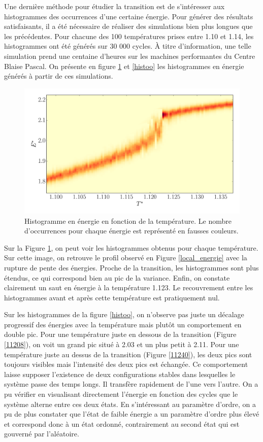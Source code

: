 \documentclass[11pt,a4paper]{article}
\numberwithin{equation}{section}
\begin{document}
Une dernière méthode pour étudier la transition est de s'intéresser aux histogrammes des occurrences d'une certaine énergie. Pour générer des résultats satisfaisants, il a été nécessaire de réaliser des simulations bien plus longues que les précédentes. Pour chacune des 100 températures prises entre 1.10 et 1.14, les histogrammes ont été générés sur 30 000 cycles. À titre d'information, une telle simulation prend une centaine d'heures sur les machines performantes du Centre Blaise Pascal. On présente en figure \ref{imagehisto} et \ref{histoo} les histogrammes en énergie générés à partir de ces simulations.

\begin{figure}[h!]
    \centering	    
	\includegraphics[scale=0.5]{figures/histo_image.pdf}
    \caption{Histogramme en énergie en fonction de la température. Le nombre d’occurrences pour chaque énergie est représenté en fausses couleurs.}
    	\label{imagehisto} 
\end{figure}
Sur la Figure \ref{imagehisto}, on peut voir les histogrammes obtenus pour chaque température. Sur cette image, on retrouve le profil observé en Figure \ref{local_energie} avec la rupture de pente des énergies. Proche de la transition, les histogrammes sont plus étendus, ce qui correspond bien au pic de la variance. Enfin, on constate clairement un saut en énergie à la température 1.123. Le recouvrement entre les histogrammes avant et après cette température est pratiquement nul.
\medskip

Sur les histogrammes de la figure \ref{histoo}, on n'observe pas juste un décalage progressif des énergies avec la température mais plutôt un comportement en double pic. Pour une température juste en dessous de la transition (Figure \ref{11208}), on voit un grand pic situé à 2.03 et un plus petit à 2.11. Pour une température juste au dessus de la transition (Figure \ref{11240}), les deux pics sont toujours visibles mais l'intensité des deux pics est échangée. Ce comportement laisse supposer l'existence de deux configurations stables dans lesquelles le système passe des temps longs. Il transfère rapidement de l'une vers l'autre. On a pu vérifier en visualisant directement l'énergie en fonction des cycles que le système alterne entre ces deux états. En s'intéressant au paramètre d'ordre, on a pu de plus constater que l'état de faible énergie a un paramètre d'ordre plus élevé et correspond donc à un état ordonné, contrairement au second état qui est gouverné par l'aléatoire.
\medskip
\end{document}
